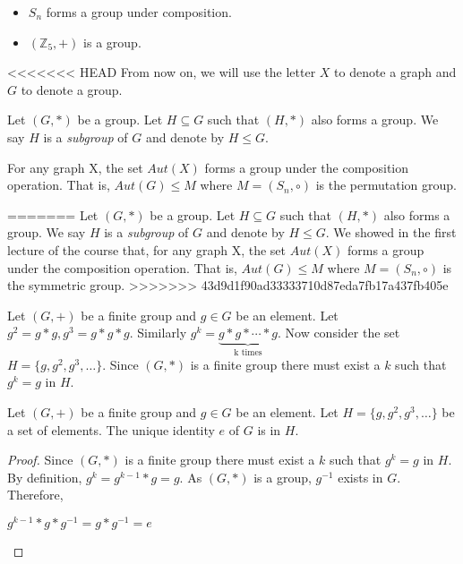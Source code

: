 \begin{example}
\begin{itemize}
\item $S_n$ forms a group under composition.
\item $(\mathbb{Z}_5,+)$ is a group.
\end{itemize}
\end{example}

<<<<<<< HEAD
From now on, we will use the letter $X$ to denote a graph and $G$ to denote a group.

\begin{remark} 
Let $(G,*)$ be a group. Let $H\subseteq G$ such that $(H,*)$ also forms a group. We say $H$ is a {\em subgroup} of $G$ and denote by $H\leq G$.   
\end{remark}


\begin{exercise}
For any graph X, the set $Aut(X)$ forms a group under the composition operation. That is, $Aut(G)\leq M$ where $M=(S_n,\circ)$ is the permutation group.
\end{exercise}
=======
Let $(G,*)$ be a group. Let $H\subseteq G$ such that $(H,*)$ also forms a group. We say $H$ is a {\em subgroup} of $G$ and denote by $H\leq G$. We showed in the first lecture of the course that, for any graph X, the set $Aut(X)$ forms a group under the composition operation. That is, $Aut(G)\leq M$ where $M=(S_n,\circ)$ is the symmetric group.
>>>>>>> 43d9d1f90ad33333710d87eda7fb17a437fb405e

Let $(G,+)$ be a finite group and $g\in G$ be an element. Let $g^2 =  g*g ,g^3 =  g*g*g $. Similarly $g^k = \underbrace{g*g*\cdots * g}_\text{k times}$. Now consider the set $H=  \{g,g^2,g^3,\ldots\}$. Since $(G,*)$ is a finite group there must exist a $k$ such that $g^k=g$ in $H$.

\begin{lemma}
Let $(G,+)$ be a finite group and $g\in G$ be an element. Let $H=\{g,g^2,g^3,\ldots\}$ be a set of elements. The unique identity $e$ of $G$ is in $H$.
\end{lemma}
\begin{proof}
Since $(G,*)$ is a finite group there must exist a $k$ such that $g^k=g$ in $H$. By definition, $g^k = g^{k-1}*g = g$. As $(G,*)$ is a group, $g^{-1}$ exists in $G$.\\
Therefore,
\begin{center}
$g^{k-1}*g*g^{-1} = g*g^{-1} = e$ 
\end{center}
\end{proof}


